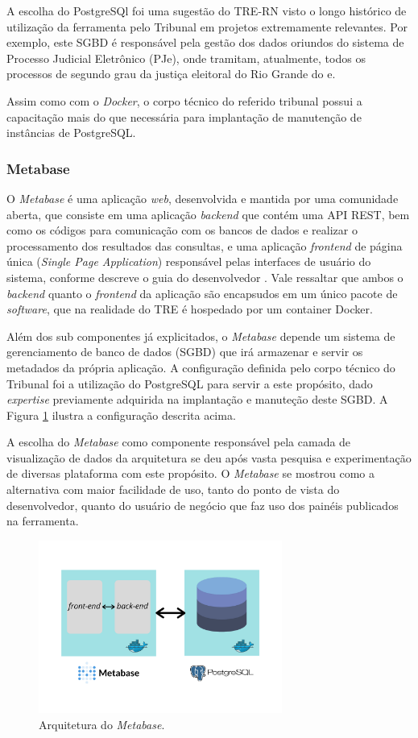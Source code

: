 A escolha do PostgreSQl foi uma sugestão do TRE-RN visto o longo histórico de utilização da ferramenta pelo Tribunal em projetos extremamente relevantes. Por exemplo, este SGBD é responsável pela gestão dos dados oriundos do sistema de Processo Judicial Eletrônico (PJe), onde tramitam, atualmente, todos os processos de segundo grau da justiça eleitoral do Rio Grande do e.

Assim como com o \textit{Docker}, o corpo técnico do referido tribunal possui a capacitação mais do que necessária para implantação de manutenção de instâncias de PostgreSQL. 

\subsubsection{Metabase}

O \textit{Metabase} é uma aplicação \textit{web}, desenvolvida e mantida por uma comunidade aberta, que consiste em uma aplicação \textit{backend} que contém uma API REST, bem como os códigos para comunicação com os bancos de dados e realizar o processamento dos resultados das consultas, e uma aplicação \textit{frontend} de página única (\textit{Single Page Application}) responsável pelas interfaces de usuário do sistema, conforme descreve o guia do desenvolvedor \cite{metabaseeevguide}. Vale ressaltar que ambos o \textit{backend} quanto o \textit{frontend} da aplicação são encapsudos em um único pacote de \textit{software}, que na realidade do TRE é hospedado por um container Docker.

Além dos sub componentes já explicitados, o \textit{Metabase} depende um sistema de gerenciamento de banco de dados (SGBD) que irá armazenar e servir os metadados da própria aplicação. A configuração definida pelo corpo técnico do Tribunal foi a utilização do PostgreSQL para servir a este propósito, dado \textit{expertise} previamente adquirida na implantação e manuteção deste SGBD. A Figura \ref{fig:arq_metabase} ilustra a configuração descrita acima. 

A escolha do \textit{Metabase} como componente responsável pela camada de visualização de dados da arquitetura se deu após vasta pesquisa e experimentação de diversas plataforma com este propósito. O \textit{Metabase} se mostrou como a alternativa com maior facilidade de uso, tanto do ponto de vista do desenvolvedor, quanto do usuário de negócio que faz uso dos painéis publicados na ferramenta. 

\begin{figure}[htp]
   \centering
    \includegraphics[width=8cm]{Imagens/Arq_Metabase}
    \caption{Arquitetura do \textit{Metabase}.}
    \label{fig:arq_metabase}
\end{figure} 


